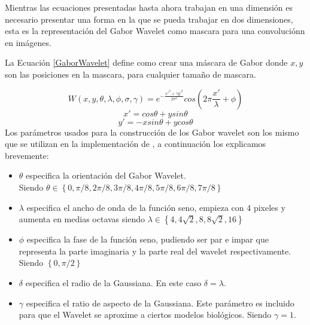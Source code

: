 Mientras las ecuaciones presentadas hasta ahora trabajan en una dimensión es necesario presentar una forma en la que se pueda trabajar en dos dimensiones, esta es la representación del Gabor Wavelet como mascara para una convoluciónn en imágenes.

La Ecuación \ref{GaborWavelet} define como crear una máscara de Gabor donde $x, y$ son las posiciones en la mascara, para cualquier tamaño de mascara.

\begin{equation}
W(x,y,\theta,\lambda, \phi, \sigma, \gamma )=e^{-\frac{x'^2+\gamma y'^2}{2 \sigma^2}}cos(2\pi \frac{x'}{\lambda}+\phi) 
\label{GaborWavelet}
\end{equation}
\begin{equation*}
x'=cos\theta+ysin\theta   
\label{GaborWaveletx}
\end{equation*}
\begin{equation*}
y'=-x sin\theta+ycos\theta
\label{GaborWavelety}
\end{equation*}
Los parámetros usados para la construcción de los Gabor wavelet son los mismo que se utilizan en la implementación de \cite{bolme2003elastic}, a continuación los explicamos brevemente:
\begin{itemize}
\item $\theta$ especifica la orientación del Gabor Wavelet.\\
Siendo $\theta \in \left\{0,\pi/8,2\pi/8,3\pi/8,4\pi/8,5\pi/8,6\pi/8,7\pi/8 \right\}$
\item $\lambda$ especifica el ancho de onda de la función seno, empieza con 4 pixeles y aumenta en medias octavas siendo $\lambda \in \left\{4,4\sqrt{2},8,8\sqrt{2},16\right\} $
\item $\phi$ especifica la fase de la función seno, pudiendo ser par e impar que representa la parte imaginaria y la parte real del wavelet respectivamente.
Siendo $\left\{0,\pi/2\right\}$
\item $\delta$ especifica el radio de la Gaussiana. En este caso $\delta=\lambda$.
\item $\gamma$ especifica el ratio de aspecto de la Gaussiana. Este parámetro es incluido para que el Wavelet se aproxime a ciertos modelos biológicos. Siendo $\gamma=1$.
\end{itemize}


